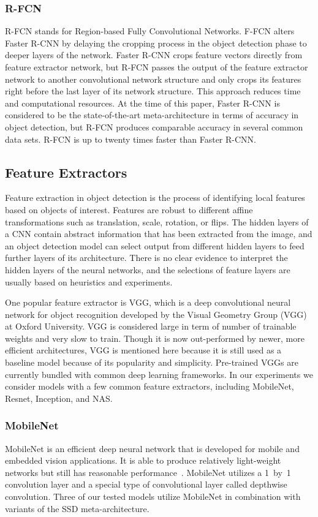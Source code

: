 \documentclass[conference]{IEEEtran}
\begin{document}
\subsubsection{R-FCN}
R-FCN stands for Region-based Fully Convolutional Networks.  F-FCN alters Faster R-CNN by delaying the cropping process in the object detection phase to deeper layers of the network. 
Faster R-CNN crops feature vectors directly from feature extractor network, but R-FCN passes the output of the feature extractor network to another convolutional network structure and only crops its features right before the last layer of its network structure. 
This approach reduces time and computational resources.
At the time of this paper, Faster R-CNN is considered to be the state-of-the-art meta-architecture in terms of accuracy in object detection, but R-FCN produces comparable accuracy in several common data sets.
R-FCN is up to twenty times faster than Faster R-CNN.

\subsection{Feature Extractors}
Feature extraction in object detection is the process of identifying local features based on objects of interest.  
Features are robust to different affine transformations such as translation, scale, rotation, or flips.
The hidden layers of a CNN contain abstract information that has been extracted from the image, and an
object detection model can select output from different hidden layers to feed further layers of its architecture.
There is no clear evidence to interpret the hidden layers of the neural networks, and the selections of feature layers are usually based on heuristics and experiments. 

One popular feature extractor is VGG, which is a deep convolutional neural network for object recognition developed by the Visual Geometry Group (VGG) at Oxford University.
VGG is considered large in term of number of trainable weights and very slow to train. 
Though it is now out-performed by newer, more efficient architectures, VGG is mentioned here because it is  still used as a baseline model because of its popularity and simplicity.
Pre-trained VGGs are currently bundled with common deep learning frameworks.
In our experiments we consider models with a few common feature extractors, including MobileNet, Resnet, Inception, and NAS.

\subsubsection{MobileNet}
MobileNet is an efficient deep neural network that is developed for  mobile and embedded vision applications.
It is able to produce relatively light-weight networks but still has reasonable performance~\cite{howard2017mobilenets}. 
MobileNet utilizes a 1~by~1 convolution layer and a special type of convolutional layer called depthwise convolution.
Three of our tested models utilize MobileNet in combination with variants of the SSD meta-architecture.
\end{document}
